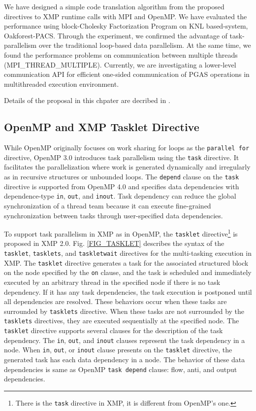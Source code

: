 ﻿\documentclass[graybox]{svmult}
\begin{document}
We have designed a simple code translation algorithm from the proposed directives to XMP runtime calls with MPI and OpenMP. We have evaluated the performance using block-Cholesky Factorization Program on KNL based-system, Oakforest-PACS. Through the experiment, we confirmed the advantage of task-parallelism over the traditional loop-based data parallelism. At the same time, we found the performance problems on communication between multiple threads (MPI\_THREAD\_MULTIPLE). Currently, we are investigating a lower-level communication API for efficient one-sided communication of PGAS operations in multithreaded execution environment.

Details of the proposal in this chpater are decribed in \cite{HPCAsia2018}.

\subsection{OpenMP and XMP Tasklet Directive}

While OpenMP originally focuses on work sharing for loops as the {\tt parallel for} directive, OpenMP 3.0 introduces task parallelism using the {\tt task} directive. It facilitates the parallelization where work is generated dynamically and irregularly as in recursive structures or unbounded loops. The {\tt depend} clause on the {\tt task} directive is supported from OpenMP 4.0 and specifies data dependencies with dependence-type {\tt in}, {\tt out}, and {\tt inout}. Task dependency can reduce the global synchronization of a thread team because it can execute fine-grained synchronization between tasks through user-specified data dependencies.

To support task parallelism in XMP as in OpenMP, the {\tt tasklet} directive\footnote{There is the {\tt task} directive in XMP, it is different from OpenMP’s one.} is proposed in XMP 2.0. Fig. \ref{FIG_TASKLET} describes the syntax of the {\tt tasklet}, {\tt tasklets}, and {\tt taskletwait} directives for the multi-tasking execution in XMP. The {\tt tasklet} directive generates a task for the associated structured block on the node specified by the {\tt on} clause, and the task is scheduled and immediately executed by an arbitrary thread in the specified node if there is no task dependency. If it has any task dependencies, the task execution is postponed until all dependencies are resolved. These behaviors occur when these tasks are surrounded by {\tt tasklets} directive. When these tasks are not surrounded by the {\tt tasklets} directives, they are executed sequentially at the specified node. The {\tt tasklet} directive supports several clauses for the description of the task dependency. The {\tt in}, {\tt out}, and {\tt inout} clauses represent the task dependency in a node. When {\tt in}, {\tt out}, or {\tt inout} clause presents on the {\tt tasklet} directive, the generated task has each data dependency in a node. The behavior of these data dependencies is same as OpenMP {\tt task depend} clause: flow, anti, and output dependencies. 
\end{document}
